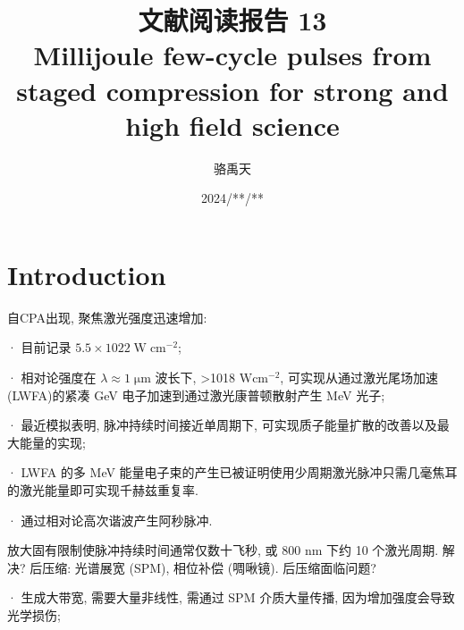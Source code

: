 \documentclass[14pt,a4paper,oneside]{article}
\title{\textbf{文献阅读报告 13\\Millijoule few-cycle pulses from staged compression for strong and high field science}\cite{stanfieldMillijouleFewcyclePulses2021}}                           %
\author{骆禹天}                                           %
\date{2024/**/**}                                        %
\begin{document}

\maketitle

\setcounter{page}{1}          %


\tableofcontents              %

\newpage
\setcounter{page}{1}          %







\section{Introduction}

自CPA出现, 聚焦激光强度迅速增加:

· 目前记录 $5.5 \times 1022\; \mathrm{W\; cm^{-2}}$\cite{yoonAchievingLaserIntensity2019};

· 相对论强度在 $\lambda  ≈ 1\; \mathrm{\mu m} $ 波长下, >1018 $\mathrm{Wcm^{-2}}$, 可实现从通过激光尾场加速 (LWFA)的紧凑 GeV 电子加速到通过激光康普顿散射产生 MeV 光子\cite{albertCharacterizationApplicationsTunable2010, chenMeVenergyRaysInverse2013};

· 最近模拟表明, 脉冲持续时间接近单周期下, 可实现质子能量扩散的改善以及最大能量的实现\cite{zhouProtonAccelerationSinglecycle2016};

· LWFA 的多 MeV 能量电子束的产生已被证明使用少周期激光脉冲只需几毫焦耳的激光能量即可实现千赫兹重复率\cite{guenotRelativisticElectronBeams2017, gustasHighchargeRelativisticElectron2018, beaurepaireElectronAccelerationSubrelativistic2014, ouilleRelativisticintensityNearsinglecycleLight2020}. 

· 通过相对论高次谐波产生阿秒脉冲\cite{naumovaRelativisticGenerationIsolated2004, heisslerFewcycleDrivenRelativistically2012}. 

放大固有限制使脉冲持续时间通常仅数十飞秒, 或 800 nm 下约 10 个激光周期. 解决? 后压缩: 光谱展宽 (SPM), 相位补偿 (啁啾镜). 后压缩面临问题?

· 生成大带宽, 需要大量非线性, 需通过 SPM 介质大量传播, 因为增加强度会导致光学损伤; 
\end{document}
